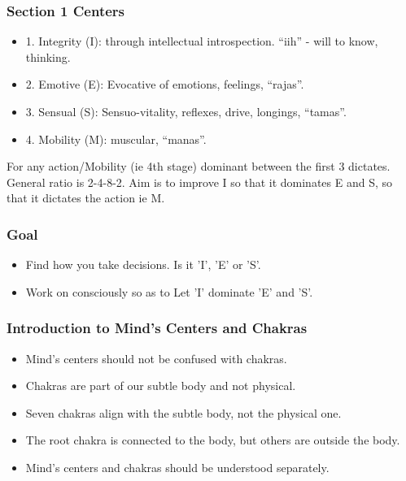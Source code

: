 \begin{frame}[fragile]
\frametitle{Section 1 Centers}

\begin{itemize}
\item 1. Integrity (I): through intellectual introspection. ``iih'' - will to know, thinking.
\item 2. Emotive (E): Evocative of emotions, feelings, ``rajas''.
\item 3. Sensual (S): Sensuo-vitality, reflexes, drive, longings, ``tamas''.
\item 4. Mobility (M): muscular, ``manas''.
\end{itemize}

For any action/Mobility (ie 4th stage) dominant between the first 3 dictates. General ratio is 2-4-8-2. Aim is to improve I so that it dominates E and S, so that it dictates the action ie M. 

\end{frame}

\begin{frame}[fragile]\frametitle{Goal}

\begin{itemize}
\item Find how you take decisions. Is it 'I', 'E' or 'S'.
\item Work on consciously so as to Let 'I' dominate 'E' and 'S'.
\end{itemize}

\end{frame}

\begin{frame}[fragile]\frametitle{Introduction to Mind's Centers and Chakras}
  \begin{itemize}
    \item Mind's centers should not be confused with chakras.
    \item Chakras are part of our subtle body and not physical.
    \item Seven chakras align with the subtle body, not the physical one.
    \item The root chakra is connected to the body, but others are outside the body.
    \item Mind's centers and chakras should be understood separately.
  \end{itemize}
\end{frame}

